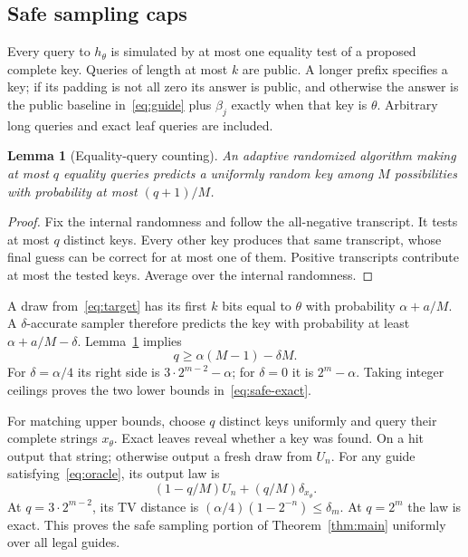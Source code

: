 \documentclass[11pt]{article}
\newtheorem{lemma}[theorem]{Lemma}
\theoremstyle{definition}\newtheorem{definition}[theorem]{Definition}
\theoremstyle{remark}\newtheorem{remark}[theorem]{Remark}
\begin{document}
\subsection{Safe sampling caps}
Every query to $h_\theta$ is simulated by at most one equality test of a proposed complete key. Queries of length at most $k$ are public. A longer prefix specifies a key; if its padding is not all zero its answer is public, and otherwise the answer is the public baseline in~\eqref{eq:guide} plus $\beta_j$ exactly when that key is $\theta$. Arbitrary long queries and exact leaf queries are included.

\begin{lemma}[Equality-query counting]\label{lem:equality}
An adaptive randomized algorithm making at most $q$ equality queries predicts a uniformly random key among $M$ possibilities with probability at most $(q+1)/M$.
\end{lemma}
\begin{proof}
Fix the internal randomness and follow the all-negative transcript. It tests at most $q$ distinct keys. Every other key produces that same transcript, whose final guess can be correct for at most one of them. Positive transcripts contribute at most the tested keys. Average over the internal randomness.
\end{proof}

A draw from~\eqref{eq:target} has its first $k$ bits equal to $\theta$ with probability $\alpha+a/M$. A $\delta$-accurate sampler therefore predicts the key with probability at least $\alpha+a/M-\delta$. Lemma~\ref{lem:equality} implies
\begin{equation}\label{eq:search-lower}
 q\ge \alpha(M-1)-\delta M.
\end{equation}
For $\delta=\alpha/4$ its right side is $3\cdot2^{m-2}-\alpha$; for $\delta=0$ it is $2^m-\alpha$. Taking integer ceilings proves the two lower bounds in~\eqref{eq:safe-exact}.

For matching upper bounds, choose $q$ distinct keys uniformly and query their complete strings $x_\theta$. Exact leaves reveal whether a key was found. On a hit output that string; otherwise output a fresh draw from $U_n$. For any guide satisfying~\eqref{eq:oracle}, its output law is
\begin{equation}\label{eq:search-law}
 (1-q/M)U_n+(q/M)\delta_{x_\theta}.
\end{equation}
At $q=3\cdot2^{m-2}$, its TV distance is $(\alpha/4)(1-2^{-n})\le\delta_m$. At $q=2^m$ the law is exact. This proves the safe sampling portion of Theorem~\ref{thm:main} uniformly over all legal guides.
\end{document}
